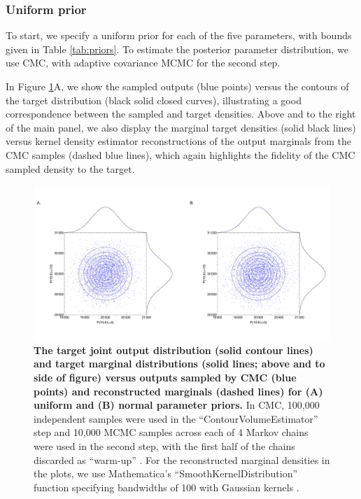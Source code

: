 \subsubsection{Uniform prior}
To start, we specify a uniform prior for each of the five parameters, with bounds given in Table \ref{tab:priors}. To estimate the posterior parameter distribution, we use CMC, with adaptive covariance MCMC \cite{johnstone2016uncertainty} for the second step.

In Figure \ref{fig:growth_factor_outputs}A, we show the sampled outputs (blue points) versus the contours of the target distribution (black solid closed curves), illustrating a good correspondence between the sampled and target densities. Above and to the right of the main panel, we also display the marginal target densities (solid black lines) versus kernel density estimator reconstructions of the output marginals from the CMC samples (dashed blue lines), which again highlights the fidelity of the CMC sampled density to the target.

\begin{figure}[H]
	\centerline{\includegraphics[width=\textwidth]{../figures/growth_factor_outputs.pdf}}
	\caption{\textbf{The target joint output distribution (solid contour lines) and target marginal distributions (solid lines; above and to side of figure) versus outputs sampled by CMC (blue points) and reconstructed marginals (dashed lines) for (A) uniform and (B) normal parameter priors.} In CMC, 100,000 independent samples were used in the ``ContourVolumeEstimator'' step and 10,000 MCMC samples across each of 4 Markov chains were used in the second step, with the first half of the chains discarded as ``warm-up'' \cite{lambert2018Student}. For the reconstructed marginal densities in the plots, we use Mathematica's ``SmoothKernelDistribution'' function specifying bandwidths of 100 with Gaussian kernels \cite{mathematica}.}
	\label{fig:growth_factor_outputs}
\end{figure}

